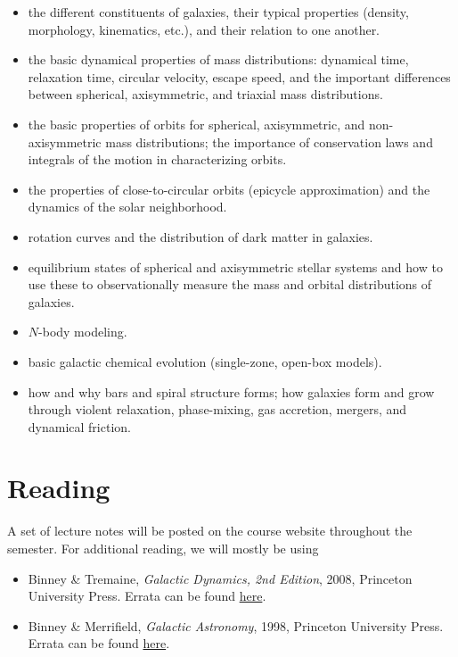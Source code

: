 \documentclass{article}
\begin{document}
\begin{itemize}

  \item the different constituents of galaxies, their typical
    properties (density, morphology, kinematics, etc.), and their
    relation to one another.

  \item the basic dynamical properties of mass distributions:
    dynamical time, relaxation time, circular velocity, escape speed,
    and the important differences between spherical, axisymmetric, and
    triaxial mass distributions.

  \item the basic properties of orbits for spherical, axisymmetric,
    and non-axisymmetric mass distributions; the importance of
    conservation laws and integrals of the motion in characterizing
    orbits.

  \item the properties of close-to-circular orbits (epicycle
    approximation) and the dynamics of the solar neighborhood.

  \item rotation curves and the distribution of dark matter in galaxies.

  \item equilibrium states of spherical and axisymmetric stellar
    systems and how to use these to observationally measure the mass and
    orbital distributions of galaxies.

  \item $N$-body modeling.

  \item basic galactic chemical evolution (single-zone, open-box
    models).

  \item how and why bars and spiral structure forms; how galaxies form
    and grow through violent relaxation, phase-mixing, gas accretion,
    mergers, and dynamical friction.

\end{itemize}

\section*{Reading}

A set of lecture notes will be posted on the course website throughout the semester. For additional reading, we will mostly be using

\begin{itemize}

  \item Binney \& Tremaine, \emph{Galactic Dynamics, 2nd Edition},
    2008, Princeton University Press. Errata can be found
    \href{https://www-thphys.physics.ox.ac.uk/people/JamesBinney/web/index\_files/BT2errors.pdf}{here}.

  \item Binney \& Merrifield, \emph{Galactic Astronomy},
    1998, Princeton University Press. Errata can be found
    \href{http://www-thphys.physics.ox.ac.uk/people/JamesBinney/bmerrors.pdf}{here}.

\end{itemize}
\end{document}
